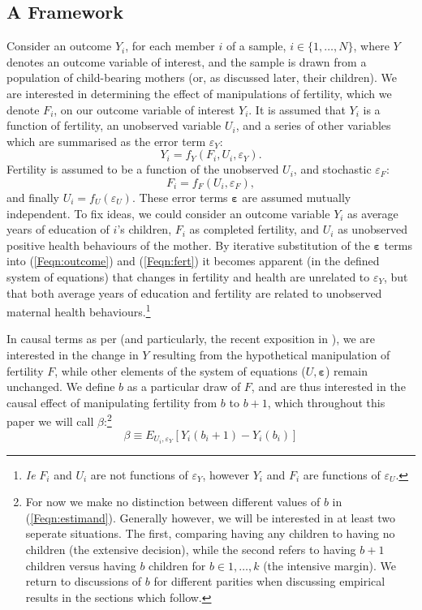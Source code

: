 \subsection{A Framework}
Consider an outcome $Y_i$, for each member $i$ of a sample, $i \in \{1,\ldots,
N\}$, where $Y$ denotes an outcome variable of interest, and the sample is drawn
from a population of child-bearing mothers (or, as discussed later, their 
children). We are 
interested in determining the effect of manipulations of fertility, which we
denote $F_i$, on our outcome variable of interest $Y_i$.  It is assumed that 
$Y_i$ is a function of fertility, an unobserved variable $U_i$, and a series of 
other variables which are summarised as the error term $\varepsilon_Y$:
\begin{equation}
\label{Feqn:outcome}
Y_i=f_Y(F_i,U_i,\varepsilon_Y).
\end{equation}
Fertility is assumed to be a function of the unobserved $U_i$, and stochastic 
$\varepsilon_F$:
\begin{equation}
\label{Feqn:fert}
F_i=f_F(U_i,\varepsilon_F),
\end{equation}
and finally $U_i=f_U(\varepsilon_U)$. These error terms $\bm\varepsilon$ are 
assumed mutually independent. To fix ideas, we could consider an outcome variable 
$Y_i$ as average years of education of $i$'s children, $F_i$ as completed 
fertility, and $U_i$ as unobserved positive health behaviours of the mother. By 
iterative substitution of the $\bm\varepsilon$ terms into (\ref{Feqn:outcome}) 
and (\ref{Feqn:fert}) it becomes apparent (in the defined system of equations) 
that changes in fertility and health are unrelated to $\varepsilon_Y$, but that 
both average years of education and fertility are related to unobserved maternal 
health behaviours.\footnote{\emph{Ie} $F_i$ and $U_i$ are not functions of 
$\varepsilon_Y$, however $Y_i$ and $F_i$ are functions of $\varepsilon_U$.}

In causal terms as per \citet{Haavelmo1943,Haavelmo1944} (and particularly, the
recent exposition in \citet{HeckmanPinto2015}), we are interested in the change
in $Y$ resulting from the hypothetical manipulation of fertility $F$, while 
other elements of the system of equations ($U,\bm\varepsilon$) remain unchanged.  
We define $b$ as a particular draw of $F$, and are thus interested in the causal 
effect of manipulating fertility from $b$ to $b+1$, which throughout this paper
we will call $\beta$:\footnote{For now we make no distinction between different 
values of $b$ in (\ref{Feqn:estimand}).  Generally however, we will be interested 
in at least two seperate situations. The first, comparing having any children 
to having no children (the extensive decision), while the second refers to 
having $b+1$ children versus having $b$ children for $b\in{1,\ldots,k}$ (the 
intensive margin).  We return to discussions of $b$ for different parities when
discussing empirical results in the sections which follow.}
\begin{equation}
\label{Feqn:estimand}
\beta\equiv E_{U_i,\varepsilon_Y}[Y_i(b_i+1)-Y_i(b_i)]
\end{equation}

